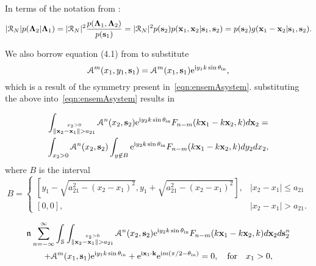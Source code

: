 \documentclass[12pt, a4paper]{article}
\begin{document}
In terms of the notation from \parencite{gower_reflection_2018}:
\begin{multline}
  |\mathcal R_N| p(\boldsymbol{\Lambda}_{2} | \boldsymbol{\Lambda}_{1}) = |\mathcal R_N|^2 \frac{p(\boldsymbol{\Lambda}_{1}, \boldsymbol{\Lambda}_{2})}{p(\mathbf s_1)} = |\mathcal R_N|^2 p(\mathbf s_2) p(\mathbf x_1, \mathbf x_2 | \mathbf s_1,\mathbf s_2) = p(\mathbf s_2) g(\mathbf x_1 - \mathbf x_2 | \mathbf s_1,\mathbf s_2).
\end{multline}

We also borrow equation (4.1) from \parencite{gower_reflection_2018} to substitute
\[
\mathcal A^m (x_1, y_1, \mathbf s_1) = \mathcal A^m (x_1, \mathbf s_1) \textrm{e}^{\textrm{i} y_1 k \sin\theta_{\mathrm{in}}},
\]
which is a result of the symmetry present in~\eqref{eqn:ensemAsystem}. substituting the above into~\eqref{eqn:ensemAsystem} results in

\begin{multline}
  \int_{\stackrel{x_2 > 0 }{\|\mathbf x_2-\mathbf x_1 \| > a_{21}}}
  \mathcal A^n (x_2, \mathbf s_2) \textrm{e}^{\textrm{i} y_2 k \sin\theta_{\mathrm{in}}}
  F_{n-m}(k\mathbf x_1 - k \mathbf x_2,k) d \mathbf x_2 =
  \\
  \int_{x_2 > 0}
  \mathcal A^n (x_2, \mathbf s_2)\int_{y \not \in B} \textrm{e}^{\textrm{i} y_2 k \sin\theta_{\mathrm{in}}}
  F_{n-m}(k\mathbf x_1 - k \mathbf x_2,k) d y_2 d x_2,
\end{multline}
where $B$ is the interval
\[
B =
\begin{cases}
  [y_1 - \sqrt{a_{21}^2-(x_2-x_1)^2}, y_1 + \sqrt{a_{21}^2-(x_2-x_1)^2}], &  |x_2-x_1| \leq a_{21}  \\
  [0,0], &  |x_2-x_1| > a_{21}.
\end{cases}
\]


\begin{multline}
\mathfrak n_{} \sum_{n=-\infty}^\infty \int_\mathcal S \int_{\stackrel{x_2 > 0 }{\|\mathbf x_2-\mathbf x_1 \| > a_{21}}}
\mathcal A^n (x_2, \mathbf s_2) \textrm{e}^{\textrm{i} y_2 k \sin\theta_{\mathrm{in}}}
F_{n-m}(k\mathbf x_1 - k \mathbf x_2,k) d \mathbf x_2 d\mathbf s_2^n
\\
+  \mathcal A^m (x_1, \mathbf s_1) \textrm{e}^{\textrm{i} y_1 k \sin\theta_{\mathrm{in}}} + \textrm{e}^{\textrm{i} \mathbf x_1 \cdot \mathbf k } \textrm{e}^{\textrm{i} m ( \pi/2 - \theta_{\mathrm{in}} )}
   = 0, \quad \text{for} \quad x_1 >0,
  \label{eqn:ensemAsystem2}
\end{multline}
\printbibliography

% 
% 
\end{document}
